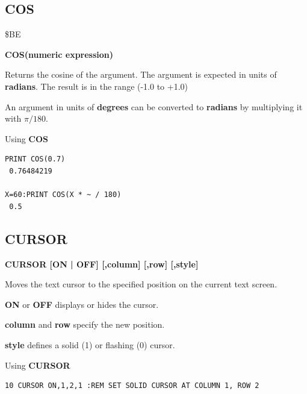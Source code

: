 
\newpage
\subsection{COS}
\begin{description}[leftmargin=2cm,style=nextline]
\item [Token:] \$BE
\item [Format:] {\bf COS(numeric expression)}
\item [Usage:] Returns the cosine of the argument.
               The argument is expected in units of {\bf radians}.
               The result is in the range (-1.0 to +1.0)

\item [Remarks:] An argument in units of {\bf degrees}
                 can be converted to {\bf radians}
                 by multiplying it with $\pi/180$.
\item [Examples:] Using {\bf COS}
\begin{tcolorbox}[colback=black,coltext=white]
\verbatimfont{\codefont}
\begin{verbatim}
PRINT COS(0.7)
 0.76484219

X=60:PRINT COS(X * ~ / 180)
 0.5
\end{verbatim}
\end{tcolorbox}
\end{description}


\newpage
\subsection{CURSOR}
\begin{description}[leftmargin=2cm,style=nextline]
\item [Format:] {\bf CURSOR [ON | OFF] [,column] [,row] [,style]}
\item [Usage:] Moves the text cursor to
               the specified position on the current text screen.

               {\bf ON} or {\bf OFF} displays or hides the cursor.

               {\bf column} and {\bf row} specify the new position.

               {\bf style} defines a solid (1) or flashing (0) cursor.

\item [Example:] Using {\bf CURSOR}
\begin{tcolorbox}[colback=black,coltext=white]
\verbatimfont{\codefont}
\begin{verbatim}
10 CURSOR ON,1,2,1 :REM SET SOLID CURSOR AT COLUMN 1, ROW 2
\end{verbatim}
\end{tcolorbox}
\end{description}

